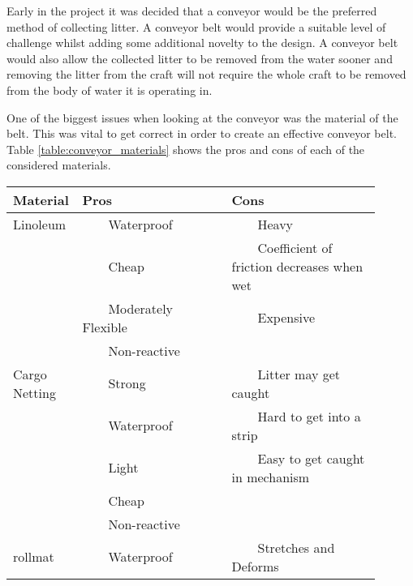 \documentclass [11pt]{article}
\newcommand{\tabitem}{~~\llap{\textbullet}~~}
\begin{document}
Early in the project it was decided that a conveyor would be the preferred method of collecting litter. A conveyor belt would provide a suitable level of challenge whilst adding some additional novelty to the design. A conveyor belt would also allow the collected litter to be removed from the water sooner and removing the litter from the craft will not require the whole craft to be removed from the body of water it is operating in. 

One of the biggest issues when looking at the conveyor was the material of the belt. This was vital to get correct in order to create an effective conveyor belt. Table \ref{table:conveyor_materials} shows the pros and cons of each of the considered materials. 

\begin{table}[H]
\centering
\setlength{\arrayrulewidth}{1.5pt}
\begin{tabular}{|p{0.1\linewidth}|p{0.4\linewidth}|p{0.4\linewidth}|}
\hline
\cellcolor{gray!40} Material & \cellcolor{gray!40}Pros & \cellcolor{gray!40} Cons \\ 
\hline
\cellcolor{gray!20} Linoleum & \cellcolor{gray!20} \tabitem Waterproof & \cellcolor{gray!20} \tabitem Heavy\\
\cellcolor{gray!20}  & \cellcolor{gray!20} \tabitem Cheap & \cellcolor{gray!20} \tabitem Coefficient of friction decreases when wet \\
\cellcolor{gray!20}  & \cellcolor{gray!20} \tabitem Moderately Flexible & \cellcolor{gray!20} \tabitem Expensive \\
\cellcolor{gray!20}  & \cellcolor{gray!20} \tabitem Non-reactive & \cellcolor{gray!20} \\
\hline
\cellcolor{gray!20} Cargo Netting & \cellcolor{gray!20} \tabitem Strong & \cellcolor{gray!20} \tabitem Litter may get caught\\
\cellcolor{gray!20}  & \cellcolor{gray!20} \tabitem Waterproof & \cellcolor{gray!20} \tabitem Hard to get into a strip \\
\cellcolor{gray!20}  & \cellcolor{gray!20} \tabitem Light & \cellcolor{gray!20} \tabitem Easy to get caught in mechanism \\
\cellcolor{gray!20}  & \cellcolor{gray!20} \tabitem Cheap & \cellcolor{gray!20} \\
\cellcolor{gray!20}  & \cellcolor{gray!20} \tabitem Non-reactive & \cellcolor{gray!20} \\
\hline
\cellcolor{gray!20} \gls{rollmat} & \cellcolor{gray!20} \tabitem Waterproof & \cellcolor{gray!20} \tabitem Stretches and Deforms\\

\end{tabular}
\end{table}
\end{document}
